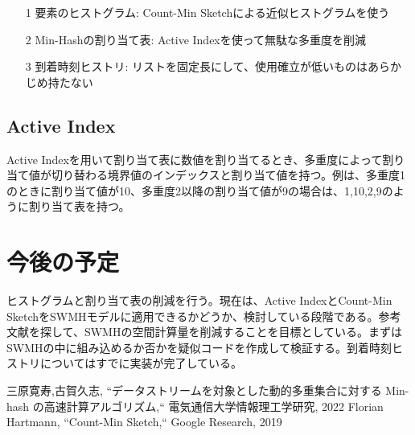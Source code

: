 \documentclass{interim} %
\begin{document}
\begin{itemize}
	\item[1] 要素のヒストグラム: Count-Min Sketchによる近似ヒストグラムを使う\cite{ck1}
	\item[2] Min-Hashの割り当て表: Active Indexを使って無駄な多重度を削減
	\item[3] 到着時刻ヒストリ: リストを固定長にして、使用確立が低いものはあらかじめ持たない
\end{itemize}

\subsection{Active Index}

Active Indexを用いて割り当て表に数値を割り当てるとき、多重度によって割り当て値が切り替わる境界値のインデックスと割り当て値を持つ。例は、多重度1のときに割り当て値が10、多重度2以降の割り当て値が9の場合は、1,10,2,9のように割り当て表を持つ。

\section{今後の予定}

ヒストグラムと割り当て表の削減を行う。現在は、Active IndexとCount-Min SketchをSWMHモデルに適用できるかどうか、検討している段階である。参考文献を探して、SWMHの空間計算量を削減することを目標としている。まずはSWMHの中に組み込めるか否かを疑似コードを作成して検証する。到着時刻ヒストリについてはすでに実装が完了している。

\begin{thebibliography}{99}
	\scriptsize  %
%	
三原寛寿,古賀久志, ``データストリームを対象とした動的多重集合に対する
Min-hash の高速計算アルゴリズム,`` 電気通信大学情報理工学研究, 2022
Florian Hartmann, ``Count-Min Sketch,``  Google Research, 2019

\end{thebibliography}
\end{document}
